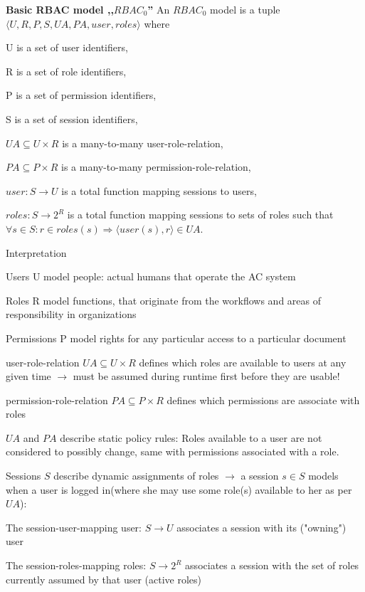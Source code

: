 \documentclass[a4paper]{article}
\renewcommand{\note}[2]{\begin{noteBox} \textbf{#1} #2 \end{noteBox}}
\begin{document}
\begin{multicols}{3}
    \note{Basic RBAC model ,,$RBAC_0$''}{An $RBAC_0$ model is a tuple $\langle U,R,P,S,UA,PA,user,roles\rangle$ where
        \begin{itemize*}
            \item U is a set of user identifiers,
            \item R is a set of role identifiers,
            \item P is a set of permission identifiers,
            \item S is a set of session identifiers,
            \item $UA\subseteq U\times R$ is a many-to-many user-role-relation,
            \item $PA\subseteq P\times R$ is a many-to-many permission-role-relation,
            \item $user:S\rightarrow U$ is a total function mapping sessions to users,
            \item $roles:S\rightarrow 2^R$ is a total function mapping sessions to sets of roles such that $\forall s\in S:r\in roles(s)\Rightarrow \langle user(s),r\rangle \in UA$.
        \end{itemize*}
    }

    Interpretation
    \begin{itemize*}
        \item Users U model people: actual humans that operate the AC system
        \item Roles R model functions, that originate from the workflows and areas of responsibility in organizations
        \item Permissions P model rights for any particular access to a particular document
        \item user-role-relation $UA\subseteq U\times R$ defines which roles are available to users at any given time $\rightarrow$ must be assumed during runtime first before they are usable!
        \item permission-role-relation $PA\subseteq P\times R$ defines which permissions are associate with roles
        \item $UA$ and $PA$ describe static policy rules: Roles available to a user are not considered to possibly change, same with permissions associated with a role.
        \item Sessions $S$ describe dynamic assignments of roles $\rightarrow$ a session $s\in S$ models when a user is logged in(where she may use some role(s) available to her as per $UA$):
        \begin{itemize*}
            \item The session-user-mapping user: $S\rightarrow U$ associates a session with its ("owning") user
            \item The session-roles-mapping roles: $S\rightarrow 2^R$ associates a session with the set of roles currently assumed by that user (active roles)
        \end{itemize*}
    \end{itemize*}


\end{multicols}
\end{document}
